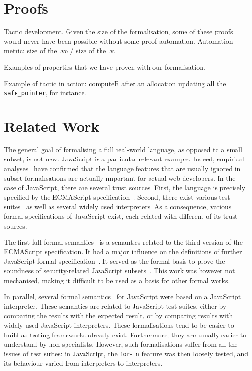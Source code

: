 \documentclass[
    sigplan,
    10pt,
    review, %
    natbib=false %
 ]{acmart}
\begin{document}
\section{Proofs}
\label{sec:proofs}

Tactic development.
Given the size of the formalisation, some of these proofs would never have been possible
without some proof automation.
Automation metric: size of the .vo / size of the .v.

Examples of properties that we have proven with our formalisation.

Example of tactic in action:
computeR after an allocation updating all the \texttt{safe_pointer}, for instance.

\section{Related Work}
\label{sec:related:work}


The general goal of formalising a full real-world language,
as opposed to a small subset, is not new.
JavaScript is a particular relevant example.
Indeed, empirical analyses~\parencite{RichardsHBV11}
have confirmed that the language features
that are usually ignored in subset-formalisations
are actually important for actual web developers.
%
In the case of JavaScript, there are several trust sources.
First, the language is precisely specified by the ECMAScript specification~\parencite{es2019}.
Second, there exist various test suites~\parencite{test262, mozillatests}
as well as several widely used interpreters.
As a consequence, various formal specifications of JavaScript exist,
each related with different of its trust sources.

The first full formal semantics~\parencite{aplas08}
is a semantics related to the third version of the ECMAScript specification.
It had a major influence on the definitions of further JavaScript formal
specification~\parencite{ses, jscert, popl12-Towards, usenix}.
It served as the formal basis to prove the soundness of security-related
JavaScript subsets~\parencite{MMT-CSF-TR09, mmt-esorics09, mmt-oakland10}.
This work was however not mechanised, making it difficult to be used
as a basis for other formal works.

In parallel, several formal semantics~\parencite{js-ml, Guha2010, Politz:S5, kjs}
for JavaScript were based on a JavaScript interpreter.
These semantics are related to JavaScript test suites,
either by comparing the results with the expected result,
or by comparing results with widely used JavaScript interpreters.
These formalisations tend to be easier to build
as testing frameworks already exist.
Furthermore, they are usually easier to understand by non-specialists.
However, such formalisations suffer from all the issues of test suites:
in JavaScript, the \texttt{for}-\texttt{in}
feature was then loosely tested,
and its behaviour varied from interpreters to interpreters.
\end{document}
